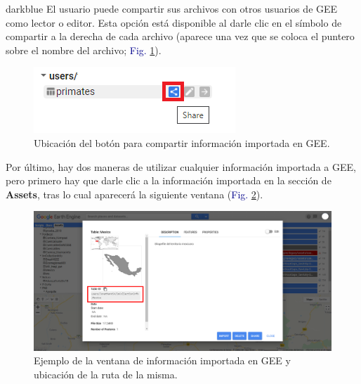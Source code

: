 \documentclass[
  12pt,
  letterpaper,
  twoside]{book}
\begin{document}
\begin{bluebox2}

\begin{awesomeblock}{5pt}{\faLightbulb}{darkblue}
El usuario puede compartir sus archivos con otros usuarios de GEE como lector o editor. Esta opción está disponible al darle clic en el símbolo de compartir a la derecha de cada archivo (aparece una vez que se coloca el puntero sobre el nombre del archivo; \textcolor{darkblue}{Fig.} \ref{fig:f45}).

\end{awesomeblock}

\end{bluebox2}

\begin{figure}[H]

{\centering \includegraphics[width=0.5\linewidth]{Img/shareAssets} 

}

\caption{Ubicación del botón para compartir información importada en GEE.}\label{fig:f45}
\end{figure}

Por último, hay dos maneras de utilizar cualquier información importada a GEE, pero primero hay que darle clic a la información importada en la sección de \textbf{Assets}, tras lo cual aparecerá la siguiente ventana (\textcolor{darkblue}{Fig.} \ref{fig:f46}).

\begin{figure}[H]

{\centering \includegraphics[width=0.95\linewidth]{Img/Asset_ruta} 

}

\caption{Ejemplo de la ventana de información importada en GEE y ubicación de la ruta de la misma.}\label{fig:f46}
\end{figure}
\end{document}
